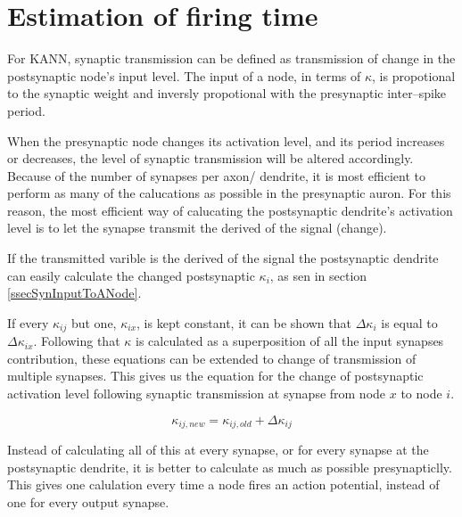 	\section{Estimation of firing time}
	For KANN, synaptic transmission can be defined as transmission of change in the postsynaptic node's input level.
	The input of a node, in terms of $\kappa$, is propotional to the synaptic weight and inversly propotional with the presynaptic inter--spike period.

	When the presynaptic node changes its activation level, and its period increases or decreases, the level of synaptic transmission will be altered accordingly. 
	Because of the number of synapses per axon/ dendrite, it is most efficient to perform as many of the calucations as possible in the presynaptic auron.
	For this reason, the most efficient way of calucating the postsynaptic dendrite's activation level is to let the synapse transmit the derived of the signal (change).

	If the transmitted varible is the derived of the signal the postsynaptic dendrite can easily calculate the changed postsynaptic $\kappa_i$, as sen in section \ref{ssecSynInputToANode}.
	
	If every $\kappa_{ij}$ but one, $\kappa_{ix}$, is kept constant, it can be shown that $\Delta \kappa_i$ is equal to $\Delta \kappa_{ix}$.
	Following that $\kappa$ is calculated as a superposition of all the input synapses contribution, these equations can be extended to change of transmission of multiple synapses.
	This gives us the equation for the change of postsynaptic activation level following synaptic transmission at synapse from node $x$ to node $i$.

	\begin{equation}
		\kappa_{ij, new} = \kappa_{ij, old} + \Delta \kappa_{ij}
	\end{equation}

	Instead of calculating all of this at every synapse, or for every synapse at the postsynaptic dendrite, it is better to calculate as much as possible presynapticlly.
	This gives one calulation every time a node fires an action potential, instead of one for every output synapse.

